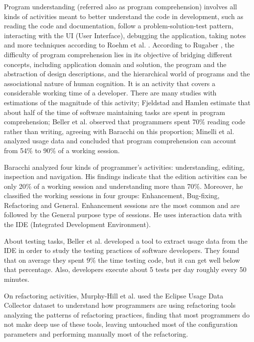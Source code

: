 Program understanding (referred also as program comprehension) involves all kinds of activities meant to better understand the code in development, such as reading the code and documentation, follow a problem-solution-test pattern, interacting with the UI (User Interface), debugging the application, taking notes and more techniques according to Roehm et al. \cite{RTK12}. According to Rugaber \cite{R95}, the difficulty of program comprehension lies in its objective of bridging different concepts, including application domain and solution, the program and the abstraction of design descriptions, and the hierarchical world of programs and the associational nature of human cognition. It is an activity that covers a considerable working time of a developer. There are many studies with estimations of the magnitude of this activity; Fjeldstad and Hamlen \cite{FH83} estimate that about half of the time of software maintaining tasks are spent in program comprehension; Beller et al. \cite{BGZ15} observed that programmers spent 70\% reading code rather than writing, agreeing with Baracchi \cite{B14} on this proportion; Minelli et al. \cite{MMLK14} analyzed usage data and concluded that program comprehension can account from 54\% to 90\% of a working session.

Baracchi \cite{B14} analyzed four kinds of programmer's activities: understanding, editing, inspection and navigation. His findings indicate that the edition activities can be only 20\% of a working session and understanding more than 70\%. Moreover, he classified the working sessions in four groups: Enhancement, Bug-fixing, Refactoring and General. Enhancement sessions are the most common and are followed by the General purpose type of sessions. He uses interaction data with the IDE (Integrated Development Environment).

About testing tasks, Beller et al. \cite{BGZ15} developed a tool to extract usage data from the IDE in order to study the testing practices of software developers. They found that on average they spent 9\% the time testing code, but it can get well below that percentage. Also, developers execute about 5 tests per day roughly every 50 minutes.


On refactoring activities, Murphy-Hill et al. \cite{MPB12} used the Eclipse Usage Data Collector dataset to understand how programmers are using refactoring tools analyzing the patterns of refactoring practices, finding that most programmers do not make deep use of these tools, leaving untouched most of the configuration parameters and performing manually most of the refactoring.

